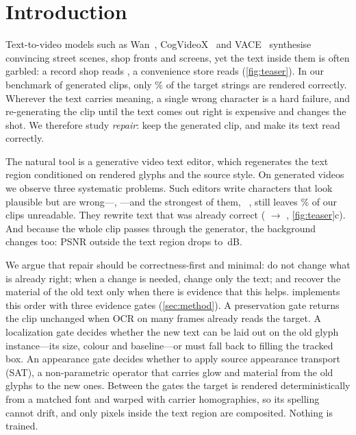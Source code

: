 \section{Introduction}
\label{sec:intro}

Text-to-video models such as Wan~\cite{wan2025wan}, CogVideoX~\cite{yang2025cogvideox} and VACE~\cite{jiang2025vace} synthesise convincing street scenes, shop fronts and screens, yet the text inside them is often garbled: a record shop reads , a convenience store reads  (\cref{fig:teaser}). In our benchmark of generated clips, only \rOrigRead\% of the target strings are rendered correctly. Wherever the text carries meaning, a single wrong character is a hard failure, and re-generating the clip until the text comes out right is expensive and changes the shot. We therefore study \emph{repair}: keep the generated clip, and make its text read correctly.

The natural tool is a generative video text editor, which regenerates the text region conditioned on rendered glyphs and the source style. On generated videos we observe three systematic problems. Such editors write characters that look plausible but are wrong---, ---and the strongest of them, \steer~\cite{zeng2026steervte}, still leaves \rSteerUnread\% of our clips unreadable. They rewrite text that was already correct ( $\to$ , \cref{fig:teaser}c). And because the whole clip passes through the generator, the background changes too: PSNR outside the text region drops to \rSteerBG\,dB.

We argue that repair should be correctness-first and minimal: do not change what is already right; when a change is needed, change only the text; and recover the material of the old text only when there is evidence that this helps. \method implements this order with three evidence gates (\cref{sec:method}). A preservation gate returns the clip unchanged when OCR on many frames already reads the target. A localization gate decides whether the new text can be laid out on the old glyph instance---its size, colour and baseline---or must fall back to filling the tracked box. An appearance gate decides whether to apply source appearance transport (SAT), a non-parametric operator that carries glow and material from the old glyphs to the new ones. Between the gates the target is rendered deterministically from a matched font and warped with carrier homographies, so its spelling cannot drift, and only pixels inside the text region are composited. Nothing is trained.

